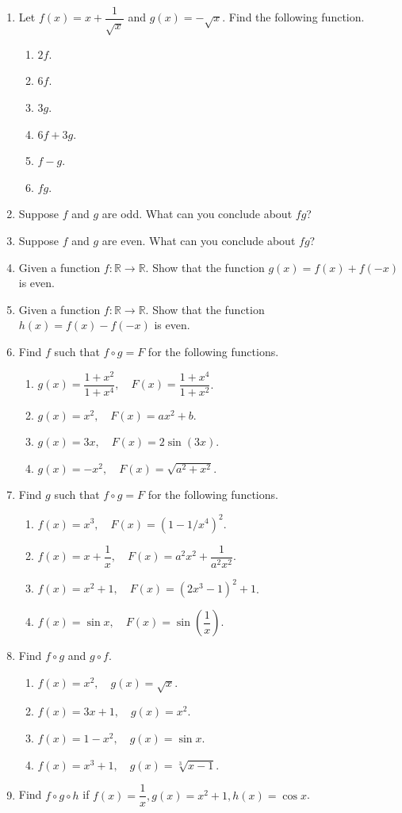 \documentclass[11pt]{book}
\theoremstyle{break}
\theoremstyle{no_label}
\newcommand{\bbR}{\mathbb{R}}
\numberwithin{equation}{section}
\begin{document}
\begin{enumerate}[label=\arabic*.]
    \item Let $f(x)=x+\dfrac{1}{\sqrt{x}}$ and $g(x)=-\sqrt{x}$. Find the following function.
    \begin{enumerate}
        \item $2f$.
        \item $6f$.
        \item $3g$.
        \item $6f+3g$.
        \item $f-g$.
        \item $fg$.
    \end{enumerate}
    \item Suppose $f$ and $g$ are odd. What can you conclude about $fg$?
    \item Suppose $f$ and $g$ are even. What can you conclude about $fg$?
    \item Given a function $f:\bbR\to\bbR$. Show that the function $g(x)=f(x)+f(-x)$ is even.
    \item Given a function $f:\bbR\to\bbR$. Show that the function $h(x)=f(x)-f(-x)$ is even.
    \item Find $f$ such that $f\circ g=F$ for the following functions.
    \begin{enumerate}
        \item $g(x)=\dfrac{1+x^2}{1+x^4}, \quad F(x)=\dfrac{1+x^4}{1+x^2}$.
        \item $g(x)=x^2, \quad F(x)=ax^2+b$.
        \item $g(x)=3x, \quad F(x)=2\sin(3x)$.
        \item $g(x)=-x^2, \quad F(x)=\sqrt{a^2+x^2}$.
    \end{enumerate}
    \item Find $g$ such that $f\circ g=F$ for the following functions.
    \begin{enumerate}
        \item $f(x)=x^3, \quad F(x)=(1-1/x^4)^2$.
        \item $f(x)=x+\dfrac{1}{x}, \quad F(x)=a^2x^2+\dfrac{1}{a^2x^2}$.
        \item $f(x)=x^2+1, \quad F(x)=(2x^3-1)^2+1$.
        \item $f(x)=\sin x, \quad F(x)=\sin\left(\dfrac{1}{x}\right)$.
    \end{enumerate}
    \item Find $f\circ g$ and $g\circ f$.
    \begin{enumerate}
        \item $f(x)=x^2, \quad g(x)=\sqrt{x}$.
        \item $f(x)=3x+1, \quad g(x)=x^2$.
        \item $f(x)=1-x^2, \quad g(x)=\sin x$.
        \item $f(x)=x^3+1, \quad g(x)=\sqrt[3]{x-1}$.
    \end{enumerate}
    \item Find $f\circ g\circ h$ if $f(x)=\dfrac{1}{x}, g(x)=x^2+1, h(x)=\cos x$.
\end{enumerate}
\end{document}
